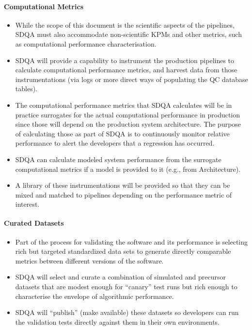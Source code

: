 \paragraph{Computational Metrics}
\label{sec:qaComputational}
\begin{itemize}

\item While the scope of this document is the scientific aspects of the pipelines, SDQA must also accommodate non-scientific KPMs and other metrics, such as computational performance characterisation.

\item SDQA will provide a capability to instrument the production pipelines to calculate computational performance metrics, and harvest data from those instrumentations (via logs or more direct ways of populating the QC database tables).

\item The computational performance metrics that SDQA calculates will be in practice surrogates for the actual computational performance in production since those will depend on the production system architecture. The purpose of calculating those as part of SDQA is to continuously monitor relative performance to alert the developers that a regression has occurred.

\item SDQA can calculate modeled system performance from the surrogate computational metrics if a model is provided to it (e.g., from Architecture).

\item A library of these instrumentations will be provided so that they can be mixed and matched to pipelines depending on the performance metric of interest.

\end{itemize}

\paragraph{Curated Datasets}
\label{sec:qaCurateddata}
\begin{itemize}

\item Part of the process for validating the software and its performance is selecting rich but targeted standardized data sets to generate directly comparable metrics between different versions of the software.

\item SDQA will select and curate a combination of simulated and precursor datasets that are modest enough for ``canary'' test runs but rich enough to characterise the envelope of algorithmic performance.

\item SDQA will ``publish'' (make available) these datasets so developers can run the validation tests directly against them in their own environments.

\end{itemize}



